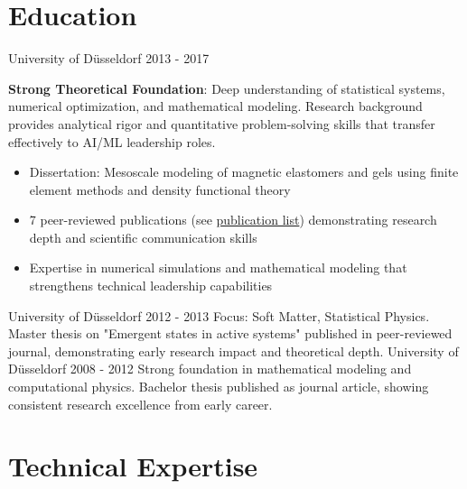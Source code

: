 \documentclass[singlesided,
               paper=a4,
               fontsize=10pt
              ]{my-resume}
\begin{document}
\section[\faMortarBoard]{Education}
    {University of Düsseldorf}
    {2013 - 2017}
    {
        \textbf{Strong Theoretical Foundation}: Deep understanding of statistical systems, numerical optimization, and mathematical modeling. Research background provides analytical rigor and quantitative problem-solving skills that transfer effectively to AI/ML leadership roles.
        \begin{itemize}[leftmargin=2em]
            \item Dissertation: Mesoscale modeling of magnetic elastomers and gels using finite element methods and density functional theory
            \item 7 peer-reviewed publications (see \href{https://scholar.google.com/citations?hl=de&user=MnU8ZxwAAAAJ}{publication list}) demonstrating research depth and scientific communication skills
            \item Expertise in numerical simulations and mathematical modeling that strengthens technical leadership capabilities
        \end{itemize}
    }
%
    {University of Düsseldorf}
    {2012 - 2013}
    {
        Focus: Soft Matter, Statistical Physics. Master thesis on "Emergent states in active systems" published in peer-reviewed journal, demonstrating early research impact and theoretical depth.
    }
%
    {University of Düsseldorf}
    {2008 - 2012}
    {
        Strong foundation in mathematical modeling and computational physics. Bachelor thesis published as journal article, showing consistent research excellence from early career.
    }


\section[\faFlask]{Technical Expertise}
\end{document}
